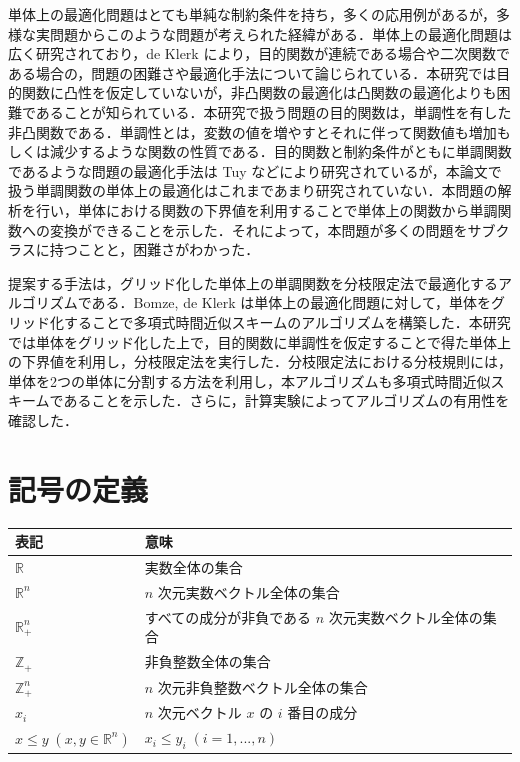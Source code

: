 \documentclass[a4paper,11pt]{jreport}
\begin{document}
単体上の最適化問題はとても単純な制約条件を持ち，多くの応用例があるが，多様な実問題からこのような問題が考えられた経緯がある．単体上の最適化問題は広く研究されており，de Klerk \cite{deklerk_survey} \cite{deklerk} により，目的関数が連続である場合や二次関数である場合の，問題の困難さや最適化手法について論じられている．本研究では目的関数に凸性を仮定していないが，非凸関数の最適化は凸関数の最適化よりも困難であることが知られている．本研究で扱う問題の目的関数は，単調性を有した非凸関数である．単調性とは，変数の値を増やすとそれに伴って関数値も増加もしくは減少するような関数の性質である．目的関数と制約条件がともに単調関数であるような問題の最適化手法は Tuy \cite{tuy} \cite{tuy_survey} などにより研究されているが，本論文で扱う単調関数の単体上の最適化はこれまであまり研究されていない．本問題の解析を行い，単体における関数の下界値を利用することで単体上の関数から単調関数への変換ができることを示した．それによって，本問題が多くの問題をサブクラスに持つことと，困難さがわかった．\par
提案する手法は，グリッド化した単体上の単調関数を分枝限定法で最適化するアルゴリズムである．Bomze, de Klerk \cite{bomze} は単体上の最適化問題に対して，単体をグリッド化することで多項式時間近似スキームのアルゴリズムを構築した．本研究では単体をグリッド化した上で，目的関数に単調性を仮定することで得た単体上の下界値を利用し，分枝限定法を実行した．分枝限定法における分枝規則には，単体を2つの単体に分割する方法を利用し，本アルゴリズムも多項式時間近似スキームであることを示した．さらに，計算実験によってアルゴリズムの有用性を確認した．

\section{記号の定義}

\begin{table}[htb]
\begin{tabular}{ll}
表記 & 意味 \\ \hline
$ \mathbb{R} $ & 実数全体の集合 \\
$ \mathbb{R}^n $ & $ n $ 次元実数ベクトル全体の集合 \\
$ \mathbb{R}_+^n $ & すべての成分が非負である $ n $ 次元実数ベクトル全体の集合 \\
$ \mathbb{Z}_+ $ & 非負整数全体の集合 \\
$ \mathbb{Z}_+^n $ & $ n $ 次元非負整数ベクトル全体の集合 \\
$ x_i $ & $ n $ 次元ベクトル $ x $ の $ i $ 番目の成分 \\
$ x \leq y \; (x, y \in \mathbb{R}^n) $ & $ x_i \leq y_i \; (i = 1, ..., n) $
\end{tabular}
\end{table}
\end{document}
